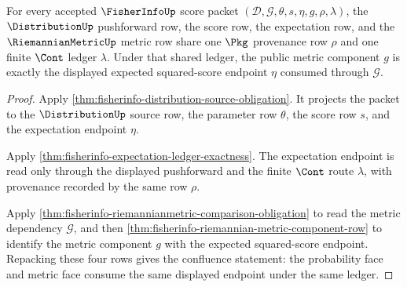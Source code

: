 \begin{theorem}
\label{thm:fisherinfo-score-expectation-metric-confluence}
For every accepted $\FisherInfoUp$ score packet
$(\mathcal{D},\mathcal{G},\theta,s,\eta,g,\rho,\lambda)$, the
$\DistributionUp$ pushforward row, the score row, the expectation row, and
the $\RiemannianMetricUp$ metric row share one $\Pkg$ provenance row $\rho$
and one finite $\Cont$ ledger $\lambda$. Under that shared ledger, the public
metric component $g$ is exactly the displayed expected squared-score endpoint
$\eta$ consumed through $\mathcal{G}$.
\end{theorem}
\begin{proof}
Apply \autoref{thm:fisherinfo-distribution-source-obligation}. It projects the
packet to the $\DistributionUp$ source row, the parameter row $\theta$, the
score row $s$, and the expectation endpoint $\eta$.

Apply \autoref{thm:fisherinfo-expectation-ledger-exactness}. The expectation
endpoint is read only through the displayed pushforward and the finite
$\Cont$ route $\lambda$, with provenance recorded by the same row $\rho$.

Apply \autoref{thm:fisherinfo-riemannianmetric-comparison-obligation} to read
the metric dependency $\mathcal{G}$, and then
\autoref{thm:fisherinfo-riemannian-metric-component-row} to identify the
metric component $g$ with the expected squared-score endpoint. Repacking these
four rows gives the confluence statement: the probability face and metric face
consume the same displayed endpoint under the same ledger.
\end{proof}

